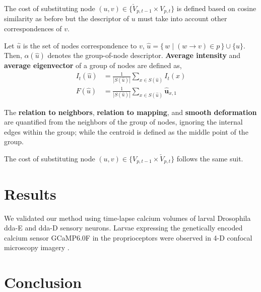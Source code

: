 \documentclass{article}
\begin{document}
The cost of substituting node $(u,v) \in \{ \check{V}_{p,t-1} \times V_{p,t} \}$ is defined based on cosine similarity as before but the descriptor of $u$ must take into account other correspondences of $v$.

Let $\hat{u}$ is the set of nodes correspondence to $v$, $\hat{u} = \{\, w \mid (w \rightarrow v) \in p \,\} \cup \{u\}$. Then, $\alpha(\hat{u})$ denotes the group-of-node descriptor. \textbf{Average intensity} and \textbf{average eigenvector} of a group of nodes are defined as,
\begin{equation}
\begin{aligned}
I_t(\hat{u}) & = \frac{1}{|S(\hat{u})|}\sum_{x \in S(\hat{u})} I_t(x) \\
F(\hat{u}) & = \frac{1}{|S(\hat{u})|}\sum_{x \in S(\hat{u})} \hat{\textbf{u}}_{x,1}
\end{aligned}
\end{equation} 

The \textbf{relation to neighbors}, \textbf{relation to mapping}, and \textbf{smooth deformation} are quantified from the neighbors of the group of nodes, ignoring the internal edges within the group; while the centroid is defined as the middle point of the group.

The cost of substituting node $(u,v) \in \{ V_{p,t-1} \times \check{V}_{p,t} \}$ follows the same suit.


\section{Results}
We validated our method using time-lapse calcium volumes of larval Drosophila dda-E and dda-D sensory neurons. Larvae expressing the genetically encoded calcium sensor GCaMP6.0F in the proprioceptors were observed in 4-D confocal microscopy imagery \cite{He2019}.

\section{Conclusion}

\vfill
\pagebreak
\end{document}

